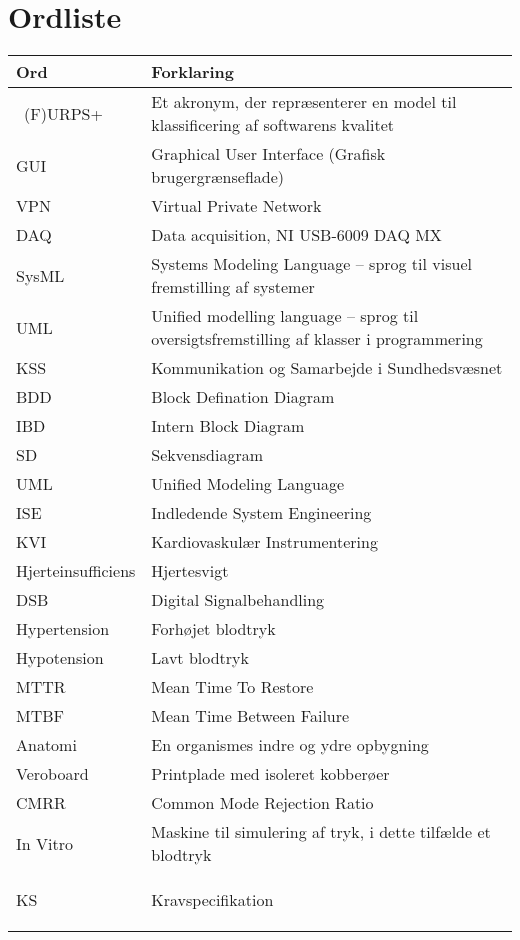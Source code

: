 \chapter{Ordliste}

\begin{longtabu} to 
    Ord &    Forklaring\\
    \toprule \
   (F)URPS+ 	&    Et akronym, der repræsenterer en model til klassificering af softwarens kvalitet \\
    GUI		&	Graphical User Interface (Grafisk brugergrænseflade)\\
    VPN		&	Virtual Private Network\\
    DAQ		&	Data acquisition, NI USB-6009 DAQ MX \\
    SysML	&   Systems Modeling Language – sprog til visuel fremstilling af systemer \\
    UML		& Unified modelling language – sprog til oversigtsfremstilling af klasser i programmering \\
    KSS		&	Kommunikation og Samarbejde i Sundhedsvæsnet \\
    BDD 	&	Block Defination Diagram \\
	IBD		& 	Intern Block Diagram \\
	SD		& 	Sekvensdiagram \\
	UML		& 	Unified Modeling Language \\
	ISE 	&	Indledende System Engineering \\
	KVI		&	Kardiovaskulær Instrumentering \\
	Hjerteinsufficiens &  Hjertesvigt \\
	DSB		&	Digital Signalbehandling \\
	Hypertension &  Forhøjet blodtryk \\
	Hypotension & Lavt blodtryk \\
	MTTR	&	Mean Time To Restore \\
	MTBF	&	Mean Time Between Failure \\
	Anatomi & 	En organismes indre og ydre opbygning \\
	Veroboard & Printplade med isoleret kobberøer\\
	CMRR 	& 	Common Mode Rejection Ratio\\ 
	In Vitro &  Maskine til simulering af tryk, i dette tilfælde et blodtryk \\
	KS 		&	Kravspecifikation
 
\label{forkort}
\end{longtabu}
